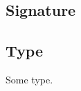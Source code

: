 \subsection{Signature\label{Nested-F-signature}}%
\subsection{Type\label{Nested-F-type_3}}%
\label{Nested-F-type-t}\begin{ocamlindent}Some type.\end{ocamlindent}%
\medbreak


